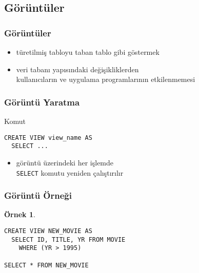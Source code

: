 \documentclass[dvipsnames]{beamer}
\theoremstyle{definition}
\theoremstyle{example}
\newtheorem{ornek}[theorem]{Örnek}
\theoremstyle{plain}
\begin{document}
\subsection{Görüntüler}

\begin{frame}
  \frametitle{Görüntüler}

  \begin{itemize}
    \item türetilmiş tabloyu taban tablo gibi göstermek

    \pause
    \item veri tabanı yapısındaki değişikliklerden\\
      kullanıcıların ve uygulama programlarının etkilenmemesi
  \end{itemize}
\end{frame}

\begin{frame}[fragile]
  \frametitle{Görüntü Yaratma}

  \begin{block}{Komut}
    \begin{lstlisting}
CREATE VIEW view_name AS
  SELECT ...
    \end{lstlisting}
  \end{block}

  \begin{itemize}
    \item görüntü üzerindeki her işlemde\\
      \lstinline!SELECT! komutu yeniden çalıştırılır
  \end{itemize}
\end{frame}

\begin{frame}[fragile]
  \frametitle{Görüntü Örneği}

  \begin{ornek}
    \begin{lstlisting}
CREATE VIEW NEW_MOVIE AS
  SELECT ID, TITLE, YR FROM MOVIE
    WHERE (YR > 1995)

SELECT * FROM NEW_MOVIE
    \end{lstlisting}
  \end{ornek}
\end{frame}
\end{document}
